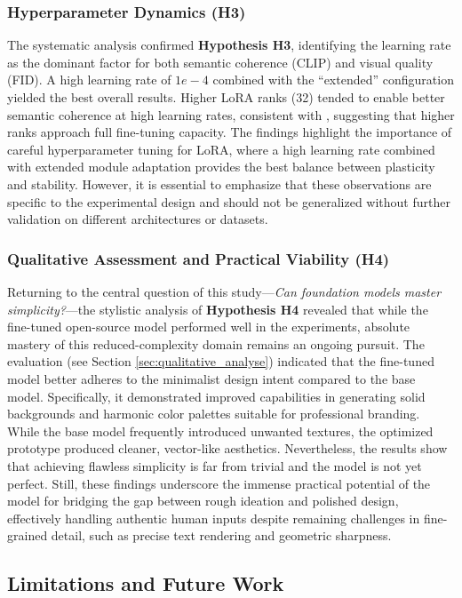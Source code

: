 \subsubsection*{Hyperparameter Dynamics (H3)}
The systematic analysis confirmed \textbf{Hypothesis H3}, identifying the learning rate as the dominant factor for both semantic coherence (CLIP) and visual quality (FID). A high learning rate of $1e-4$ combined with the ``extended'' configuration yielded the best overall results. Higher LoRA ranks (32) tended to enable better semantic coherence at high learning rates, consistent with \citet{HU2021}, suggesting that higher ranks approach full fine-tuning capacity. The findings highlight the importance of careful hyperparameter tuning for LoRA, where a high learning rate combined with extended module adaptation provides the best balance between plasticity and stability. However, it is essential to emphasize that these observations are specific to the experimental design and should not be generalized without further validation on different architectures or datasets.

\subsubsection*{Qualitative Assessment and Practical Viability (H4)}
Returning to the central question of this study---\textit{Can foundation models master simplicity?}---the stylistic analysis of \textbf{Hypothesis H4} revealed that while the fine-tuned open-source model performed well in the experiments, absolute mastery of this reduced-complexity domain remains an ongoing pursuit. The evaluation (see Section \ref{sec:qualitative_analyse}) indicated that the fine-tuned model better adheres to the minimalist design intent compared to the base model. Specifically, it demonstrated improved capabilities in generating solid backgrounds and harmonic color palettes suitable for professional branding. While the base model frequently introduced unwanted textures, the optimized prototype produced cleaner, vector-like aesthetics. Nevertheless, the results show that achieving flawless simplicity is far from trivial and the model is not yet perfect. Still, these findings underscore the immense practical potential of the model for bridging the gap between rough ideation and polished design, effectively handling authentic human inputs despite remaining challenges in fine-grained detail, such as precise text rendering and geometric sharpness.


\subsection{Limitations and Future Work}

